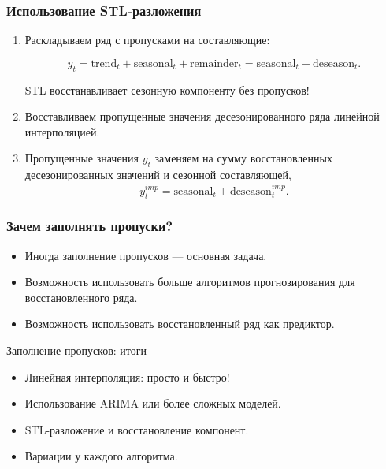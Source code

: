 \begin{frame}
  \frametitle{Использование STL-разложения}

  \begin{enumerate}[<+->]
    \item Раскладываем ряд с пропусками на составляющие: 
    
    \[
    y_t = \text{trend}_t + \text{seasonal}_t + \text{remainder}_t = \text{seasonal}_t + \text{deseason}_t.
    \]

    STL восстанавливает \alert{сезонную компоненту} без пропусков!
    \item Восставливаем пропущенные значения десезонированного ряда \alert{линейной} интерполяцией. 
    
    \item Пропущенные значения $y_t$ заменяем на сумму восстановленных десезонированных значений и сезонной составляющей,
    \[
    y_t^{imp} = \text{seasonal}_t + \text{deseason}_t^{imp}.
    \]

  \end{enumerate}

\end{frame}

\begin{frame}
  \frametitle{Зачем заполнять пропуски?}

  \begin{itemize}[<+->]
    \item Иногда заполнение пропусков — \alert{основная задача}. 
    \item Возможность использовать \alert{больше алгоритмов} прогнозирования для восстановленного ряда.
    \item Возможность использовать восстановленный ряд \alert{как предиктор}. 
  \end{itemize}
  

\end{frame}


\begin{frame}{Заполнение пропусков: итоги}

  \begin{itemize}[<+->]
    \item Линейная \alert{интерполяция}: просто и быстро! 
    \item Использование \alert{ARIMA} или более сложных моделей.
    \item \alert{STL-разложение} и восстановление компонент. 
    \item \alert{Вариации} у каждого алгоритма. 
  \end{itemize}
\end{frame}

